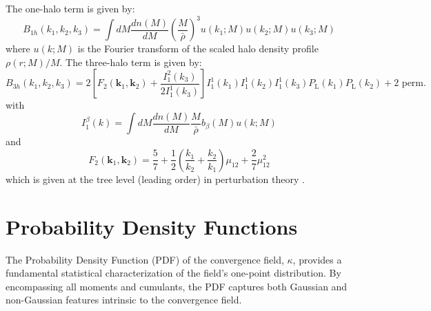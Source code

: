 The one-halo term is given by:
\begin{equation}
    B_{1h}\left(k_1, k_2, k_3\right)=\int d M \frac{d n(M)}{d M}\left(\frac{M}{\bar{\rho}}\right)^3 u\left(k_1 ; M\right) u\left(k_2 ; M\right) u\left(k_3 ; M\right)
    \label{eq:bihalofit_1h}
\end{equation}
where \( u(k; M) \) is the Fourier transform of the scaled halo density profile $\rho(r; M)/M$. The three-halo term is given by:
\begin{equation}
    B_{3h}\left(k_1, k_2, k_3\right)=2\left[F_2\left(\boldsymbol{k}_1, \boldsymbol{k}_2\right)+\frac{I_1^2\left(k_3\right)}{2 I_1^1\left(k_3\right)}\right] I_1^1\left(k_1\right) I_1^1\left(k_2\right) I_1^1\left(k_3\right) P_{\mathrm{L}}\left(k_1\right) P_{\mathrm{L}}\left(k_2\right)+2 \text { perm. }
    \label{eq:bihalofit_3h}
\end{equation}
with 
\begin{equation}
    I_1^\beta(k)=\int d M \frac{d n(M)}{d M} \frac{M}{\bar{\rho}} b_\beta(M) u(k ; M)
    \label{eq:bihalofit_3h_integral}
\end{equation}
and
\begin{equation}
    F_2\left(\boldsymbol{k}_1, \boldsymbol{k}_2\right)=\frac{5}{7}+\frac{1}{2}\left(\frac{k_1}{k_2}+\frac{k_2}{k_1}\right) \mu_{12}+\frac{2}{7} \mu_{12}^2
    \label{eq:bihalofit_3h_F2}
\end{equation}
which is given at the tree level (leading order) in perturbation theory \citep{2002PhR...367....1B}.


\section{Probability Density Functions} \label{sec:pdfs}
The Probability Density Function (PDF) of the convergence field, $\kappa$, provides a fundamental statistical characterization of the field's one-point distribution. By encompassing all moments and cumulants, the PDF captures both Gaussian and non-Gaussian features intrinsic to the convergence field.

